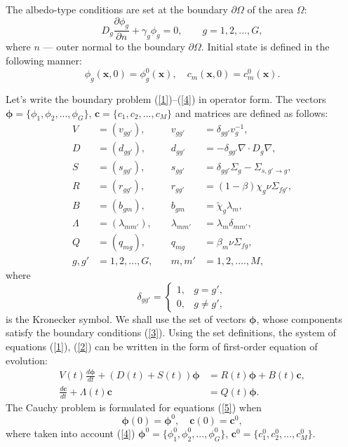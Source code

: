 \documentclass[authoryear]{elsarticle}
\begin{document}
The albedo-type conditions are set at the boundary $\partial \Omega$ of the area $\Omega$:
\begin{equation}\label{3}
 D_g\frac{\partial \phi_g}{\partial n} + \gamma_g \phi_g = 0, \quad 
 \quad g = 1,2, ..., G ,
\end{equation}
where $n$ --- outer normal to the boundary $\partial \Omega$.
Initial state is defined in the following manner:
\begin{equation}\label{4}
 \phi_g(\bm x,0) = \phi_g^0(\bm x), 
 \quad c_m(\bm x,0) = c_m^0(\bm x) . 
\end{equation} 

Let's write the boundary problem (\ref{1})--(\ref{4}) in operator form. The vectors 
 $\bm \phi = \{\phi_1, \phi_2, ..., \phi_G\}$, $\bm c = \{c_1, c_2, ..., c_M\}$ 
and matrices are defined as follows:
\[
\begin{aligned}
 V & = (v_{g g'}), &
  \quad v_{g g'} & = \delta_{g g'} v_g^{-1}, \\
 D & = (d_{g g'}), &
 \quad d_{g g'} & = - \delta_{g g'} \nabla \cdot D_g \nabla, \\
 S & = (s_{g g'}), &
 \quad  s_{g g'} & =  \delta_{g g'} \Sigma_g - \Sigma_{s,g'\rightarrow g}, \\
 R & = (r_{g g'}), &
 \quad  r_{g g'} & = (1-\beta)\chi_g \nu \Sigma_{fg'}, \\
 B & = (b_{g m}), &
 \quad b_{g m} & = \widetilde{\chi}_g \lambda_m, \\
 \Lambda & = (\lambda_{m m'}), &
 \quad  \lambda_{m m'} & = \lambda_m \delta_{m m'}, \\
 Q & = (q_{mg}), &
 \quad  q_{mg} & = \beta_m \nu \Sigma_{fg}, \\
 g, g' & = 1,2, ..., G, &
 \quad m, m'  &= 1,2, ....,M,  
\end{aligned}
\]
where
\[
 \delta_{g g'} = \left \{ 
 \begin{matrix}
 1, & g = g', \\
 0, & g \neq  g',
 \end{matrix}
 \right . 
\] 
is the Kronecker symbol.
We shall use the set of vectors $\bm \phi$, whose components 
satisfy the boundary conditions (\ref{3}). 
Using the set definitions, the system of equations (\ref{1}), (\ref{2})  
can be written in the form of first-order equation of evolution:
\begin{equation}\label{5}
\begin{split}
V(t) \frac{d \bm \phi}{d t} + (D(t)+S(t)) \bm \phi &= R(t) \bm \phi + B(t)\bm c,
\\
\frac{d \bm c}{d t} + \Lambda(t)\bm c &= Q(t) \bm \phi. 
\end{split}
\end{equation}  
The Cauchy problem is formulated for equations (\ref{5})  when 
\begin{equation}\label{6}
 \bm \phi(0) = \bm \phi^0,
 \quad   \bm c(0) = \bm c^0,
\end{equation} 
where taken into account (\ref{4}) $\bm \phi^0 = \{ \phi_1^0,  \phi_2^0, ...,  \phi_G^0 \}$,  $\bm c^0 = \{c_1^0, c_2^0, ..., c_M^0\}$.
\end{document}
